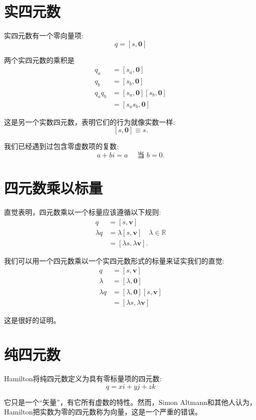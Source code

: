 \section{实四元数}
实四元数有一个零向量项:
$$
q=[s, \mathbf{0}]
$$

两个实四元数的乘积是
$$
\begin{aligned}
q_{a} & =\left[s_{a}, \mathbf{0}\right] \\
q_{b} & =\left[s_{b}, \mathbf{0}\right] \\
q_{a} q_{b} & =\left[s_{a}, \mathbf{0}\right]\left[s_{b}, \mathbf{0}\right] \\
& =\left[s_{a} s_{b}, \mathbf{0}\right]
\end{aligned}
$$

这是另一个实数四元数，表明它们的行为就像实数一样:
$$
[s, \mathbf{0}] \equiv s .
$$

我们已经遇到过包含零虚数项的复数:
$$
a+b i=a \quad \text { 当 } b=0 .
$$

\section{四元数乘以标量}
直觉表明，四元数乘以一个标量应该遵循以下规则:
$$
\begin{aligned}
q & =[s, \mathbf{v}] \\
\lambda q & =\lambda[s, \mathbf{v}] \quad \lambda \in \mathbb{R} \\
& =[\lambda s, \lambda \mathbf{v}] .
\end{aligned}
$$

我们可以用一个四元数乘以一个实四元数形式的标量来证实我们的直觉:
$$
\begin{aligned}
q & =[s, \mathbf{v}] \\
\lambda & =[\lambda, \mathbf{0}] \\
\lambda q & =[\lambda, \mathbf{0}][s, \mathbf{v}] \\
& =[\lambda s, \lambda \mathbf{v}]
\end{aligned}
$$

这是很好的证明。

\section{纯四元数}
Hamilton将纯四元数定义为具有零标量项的四元数:
$$
q=x i+y j+z k
$$

它只是一个“矢量”，有它所有虚数的特性。然而，Simon Altmann和其他人认为，Hamilton把实数为零的四元数称为向量，这是一个严重的错误。

